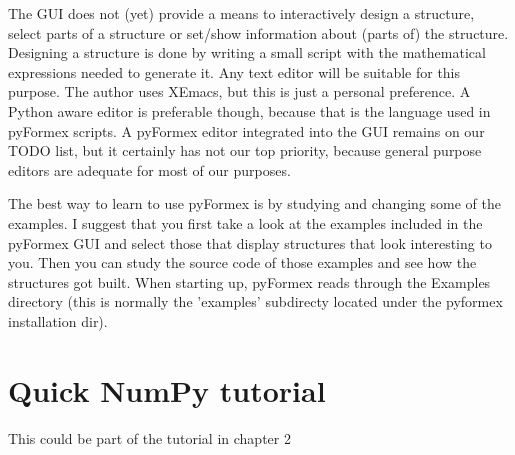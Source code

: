 \documentclass[a4paper]{manual}
\newcommand{\pyformex}{pyFormex\xspace}
\begin{document}
The GUI does not (yet) provide a means to interactively design a structure, select parts of a structure or set/show information about (parts of) the structure. Designing a structure is done by writing a small script with the mathematical expressions needed to generate it. Any text editor will be suitable for this purpose. The author uses XEmacs, but this is just a personal preference. 
A Python aware editor is preferable though, because that is the language used in pyFormex scripts.
A \pyformex editor integrated into the GUI remains on our TODO list, but it certainly has not our top priority, because general purpose editors are adequate for most of our purposes. 

The best way to learn to use pyFormex is by studying and changing some of the examples. I suggest that you first take a look at the examples included in the pyFormex GUI and select those that display structures that look interesting to you. Then you can study the source code of those examples and see how the structures got built. 
When starting up, \pyformex reads through the Examples directory (this is normally the 'examples' subdirecty located under the pyformex installation dir).  


\section{Quick NumPy tutorial}
\label{sec:numpy-tutorial}
This could be part of the tutorial in chapter 2

\end{document}
